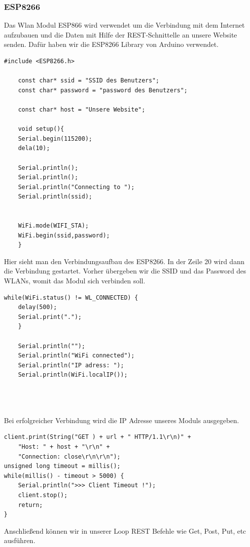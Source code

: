 \subsubsection{ESP8266}                                                                                             
Das Wlan Modul ESP866 wird verwendet um die Verbindung mit dem Internet aufzubauen und die Daten mit Hilfe der REST-Schnittelle an unsere Website senden. Dafür haben wir die ESP8266 Library von Arduino verwendet.\cite{esp8266}
\begin{lstlisting}[caption=Verbindungsaufbau des ESP8266]
	#include <ESP8266.h>
	
	const char* ssid = "SSID des Benutzers";
	const char* password = "password des Benutzers";
	
	const char* host = "Unsere Website";
	
	void setup(){
	Serial.begin(115200);
	dela(10);
	
	Serial.println();
	Serial.println();
	Serial.println("Connecting to ");
	Serial.println(ssid);
	
	
	WiFi.mode(WIFI_STA);
	WiFi.begin(ssid,password);
	}
\end{lstlisting}
                                                                                                       
Hier sieht man den Verbindungsaufbau des ESP8266. In der Zeile 20 wird dann die Verbindung gestartet. Vorher übergeben wir die SSID und das Password des WLANs, womit das Modul sich verbinden soll.
\newpage
\begin{lstlisting}[caption=Verbindungsaufbau Response]
	while(WiFi.status() != WL_CONNECTED) {
	delay(500);
	Serial.print(".");
	}
	
	Serial.println("");
	Serial.println("WiFi connected");
	Serial.println("IP adress: ");
	Serial.println(WiFi.localIP());
	
	


\end{lstlisting}

Bei erfolgreicher Verbindung wird die IP Adresse unseres Moduls ausgegeben.

\begin{lstlisting}[caption=Ausführung der REST Befehle]
client.print(String("GET ) + url + " HTTP/1.1\r\n)" +
	"Host: " + host + "\r\n" + 
	"Connection: close\r\n\r\n");
unsigned long timeout = millis();
while(millis() - timeout > 5000) {
	Serial.println(">>> Client Timeout !");
	client.stop();
	return;
}
\end{lstlisting}
Anschließend können wir in unserer Loop REST Befehle wie Get, Post, Put, etc ausführen.




